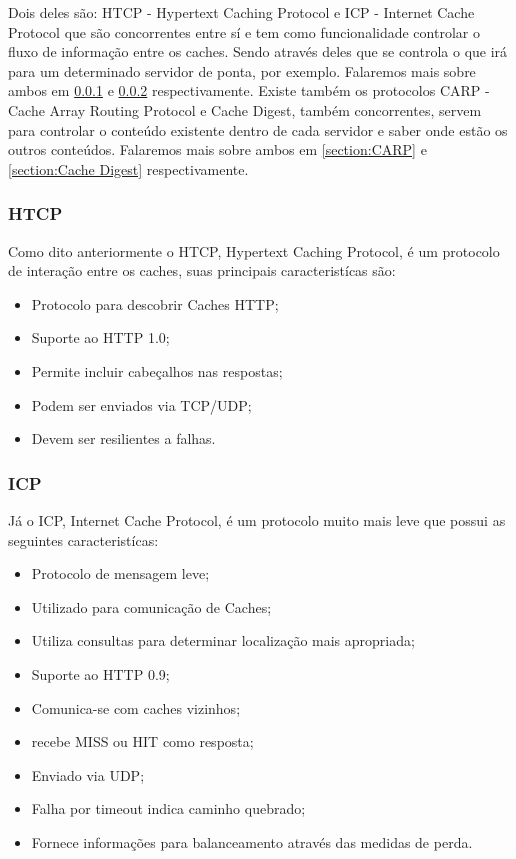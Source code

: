 Dois deles s\~ao: HTCP - Hypertext Caching Protocol e ICP - Internet Cache Protocol que s\~ao concorrentes entre s\'i e tem como funcionalidade controlar o fluxo de informa\c{c}\~ao entre os caches. Sendo atrav\'es deles que se controla o que ir\'a para um determinado servidor de ponta, por exemplo. Falaremos mais sobre ambos em \ref{section:HTCP} e \ref{section:ICP} respectivamente.
 Existe tamb\'em os protocolos CARP -  Cache Array Routing Protocol e Cache Digest, tamb\'em concorrentes, servem para controlar o conte\'udo existente dentro de cada servidor e saber onde est\~ao os outros conte\'udos. Falaremos mais sobre ambos em \ref{section:CARP} e \ref{section:Cache Digest} respectivamente.

\subsubsection{HTCP}
\label{section:HTCP}
Como dito anteriormente o HTCP, Hypertext Caching Protocol, \'e um protocolo de intera\c{c}\~ao entre os caches, suas principais caracterist\'icas s\~ao:
\begin{itemize}
\item Protocolo para descobrir Caches HTTP;
\item Suporte ao HTTP 1.0;
\item Permite incluir cabeçalhos nas respostas;
\item Podem ser enviados via TCP/UDP;
\item Devem ser resilientes a falhas.
\end{itemize}

\subsubsection{ICP}
\label{section:ICP}
J\'a o ICP, Internet Cache Protocol, \'e um protocolo muito mais leve que possui as seguintes caracterist\'icas:
\begin{itemize}
\item Protocolo de mensagem leve;
\item Utilizado para comunica\c{c}\~ao de Caches;
\item Utiliza consultas para determinar localiza\c{c}\~ao mais apropriada;
\item Suporte ao HTTP 0.9;
\item Comunica-se com caches vizinhos;
\item recebe MISS ou HIT como resposta;
\item Enviado via UDP;
\item Falha por timeout indica caminho quebrado;
\item Fornece informa\c{c}\~oes para balanceamento atrav\'es das medidas de perda.
\end{itemize}

